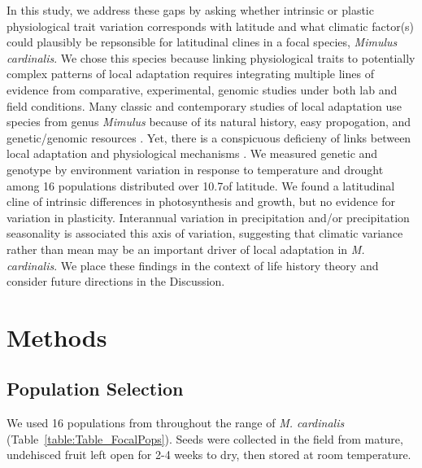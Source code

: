 \documentclass[11pt, oneside]{article}
\begin{document}

In this study, we address these gaps by asking whether intrinsic or plastic physiological trait variation corresponds with latitude and what climatic factor(s) could plausibly be repsonsible for latitudinal clines in a focal species, \textit{Mimulus cardinalis}. We chose this species because linking physiological traits to potentially complex patterns of local adaptation requires integrating multiple lines of evidence from comparative, experimental, genomic studies under both lab and field conditions. Many classic and contemporary studies of local adaptation use species from genus \textit{Mimulus} because of its natural history, easy propogation, and genetic/genomic resources \citep{Clausen_etal_1940, Hiesey_etal_1971, Bradshaw_Schemske_2003, Wu_etal_2008, Lowry_Willis_2010, Wright_etal_2013}. Yet, there is a conspicuous deficieny of links between local adaptation and physiological mechanisms \citep{Angert_2006, Angert_etal_2008, Wu_etal_2010}. We measured genetic and genotype by environment variation in response to temperature and drought among 16 populations distributed over 10.7\textdegree of latitude. We found a latitudinal cline of intrinsic differences in photosynthesis and growth, but no evidence for variation in plasticity. Interannual variation in precipitation and/or precipitation seasonality is associated this axis of variation, suggesting that climatic variance rather than mean may be an important driver of local adaptation in \textit{M. cardinalis}. We place these findings in the context of life history theory and consider future directions in the Discussion.

\section*{Methods}

\subsection*{Population Selection}

We used 16 populations from throughout the range of \textit{M. cardinalis} (Table~\ref{table:Table_FocalPops}). Seeds were collected in the field from mature, undehisced fruit left open for 2-4 weeks to dry, then stored at room temperature.
\end{document}
